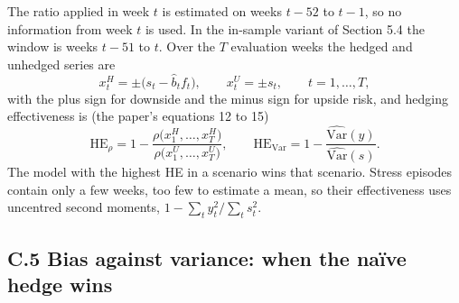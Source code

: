 \documentclass[11pt,letterpaper]{article}
\begin{document}
The ratio applied in week $t$ is estimated on weeks $t-52$ to $t-1$, so no information from week $t$ is used. In the in-sample variant of Section 5.4 the window is weeks $t-51$ to $t$. Over the $T$ evaluation weeks the hedged and unhedged series are
\begin{equation}
x^H_t = \pm\big(s_t - \hat b_t f_t\big), \qquad x^U_t = \pm s_t, \qquad t = 1,\ldots,T,
\end{equation}
with the plus sign for downside and the minus sign for upside risk, and hedging effectiveness is (the paper's equations 12 to 15)
\begin{equation}
\mathrm{HE}_\rho = 1 - \frac{\rho\big(x^H_1,\ldots,x^H_T\big)}{\rho\big(x^U_1,\ldots,x^U_T\big)}, \qquad \mathrm{HE}_{\mathrm{Var}} = 1 - \frac{\widehat{\mathrm{Var}}(y)}{\widehat{\mathrm{Var}}(s)} .
\end{equation}
The model with the highest HE in a scenario wins that scenario. Stress episodes contain only a few weeks, too few to estimate a mean, so their effectiveness uses uncentred second moments, $1 - \sum_t y_t^2 / \sum_t s_t^2$.

\subsection*{C.5 Bias against variance: when the naïve hedge wins}
\end{document}
